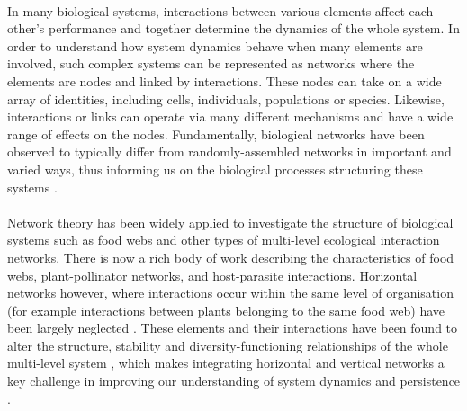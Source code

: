 \documentclass[a4,12pt]{article}
\begin{document}
    
    \paragraph{}
    In many biological systems, interactions between various elements affect each other's performance and together determine the dynamics of the whole system. In order to understand how system dynamics behave when many elements are involved, such complex systems can be represented as networks where the elements are nodes and linked by interactions. These nodes can take on a wide array of identities, including cells, individuals, populations or species. Likewise, interactions or links can operate via many different mechanisms and have a wide range of effects on the nodes. Fundamentally, biological networks have been observed to typically differ from randomly-assembled networks in important and varied ways, thus informing us on the biological processes structuring these systems \parencite{Dunne2002}.

    \paragraph{}
    Network theory has been widely applied to investigate the structure of biological systems such as food webs and other types of multi-level ecological interaction networks. There is now a rich body of work describing the characteristics of food webs, plant-pollinator networks, and host-parasite interactions. Horizontal networks however, where interactions occur within the same level of organisation (for example interactions between plants belonging to the same food web) have been largely neglected \parencite{Ellison2019}. These elements and their interactions have been found to alter the structure, stability and diversity-functioning relationships of the whole multi-level system \parencite{Hammill2015, Giling2019, Zhao2019, Miele2019}, which makes integrating horizontal and vertical networks a key challenge in improving our understanding of system dynamics and persistence \parencite{Godoy2018c}.
\end{document}

